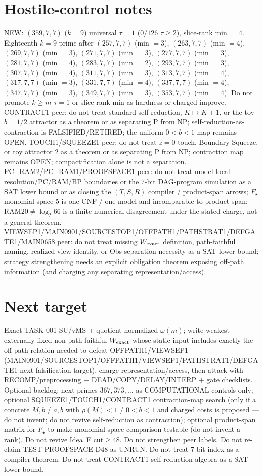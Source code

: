 \documentclass[11pt]{article}
\begin{document}
\section*{Hostile-control notes}
NEW: $(359,7,7)$ ($k{=}9$) universal $\tau{=}1$ ($0/126$ $\tau{\ge}2$), slice-rank min $=4$.
Eighteenth $k{=}9$ prime after $(257,7,7)$ (min $=3$), $(263,7,7)$ (min $=4$), $(269,7,7)$ (min $=3$), $(271,7,7)$ (min $=3$), $(277,7,7)$ (min $=3$), $(281,7,7)$ (min $=4$), $(283,7,7)$ (min $=2$), $(293,7,7)$ (min $=3$), $(307,7,7)$ (min $=4$), $(311,7,7)$ (min $=3$), $(313,7,7)$ (min $=4$), $(317,7,7)$ (min $=3$), $(331,7,7)$ (min $=4$), $(337,7,7)$ (min $=4$), $(347,7,7)$ (min $=3$), $(349,7,7)$ (min $=3$), $(353,7,7)$ (min $=4$).
Do not promote $k{\ge}m$ $\tau{=}1$ or slice-rank min as hardness or charged improve.
CONTRACT1 peer: do not treat standard self-reduction, $K\mapsto K+1$, or the toy $b{=}1/2$ attractor as a theorem or as separating P from NP;
self-reduction-as-contraction is FALSIFIED/RETIRED; the uniform $0{<}b{<}1$ map remains OPEN.
TOUCH1/SQUEEZE1 peer: do not treat $z{=}0$ touch, Boundary-Squeeze, or toy attractor $2$ as a theorem or as separating P from NP;
contraction map remains OPEN; compactification alone is not a separation.
PC\_RAM2/PC\_RAM1/PROOFSPACE1 peer: do not treat model-local resolution/PC/RAM/BP boundaries or the $7$-bit DAG-program simulation as a SAT lower bound
or as closing the $(T,S,R)$ compiler / product-span arrows; $F_\star$ monomial space $5$ is one CNF / one model and incomparable to product-span;
RAM$20\neq\log_2 66$ is a finite numerical disagreement under the stated charge, not a general theorem.
VIEWSEP1/MAIN0901/SOURCESTOP1/OFFPATH1/PATHSTRAT1/DEFGATE1/MAIN0658 peer: do not treat missing $W_{\rm exact}$ definition,
path-faithful naming, realized-view identity, or Obs-separation necessity as a SAT lower bound;
strategy strengthening needs an explicit obligation theorem exposing off-path information
(and charging any separating representation/access).

\section*{Next target}
Exact TASK-001 SU/vMS + quotient-normalized $\omega(m)$; write weakest externally fixed non-path-faithful
$W_{\rm exact}$ whose static input includes exactly the off-path relation needed to defeat OFFPATH1/VIEWSEP1
(MAIN0901/SOURCESTOP1/OFFPATH1/VIEWSEP1/PATHSTRAT1/DEFGATE1 next-falsification target), charge representation/access,
then attack with RECOMP/preprocessing + DEAD/COPY/DELAY/INTERP + gate checklists.
Optional backlog: next primes $367,373,\ldots$ as COMPUTATIONAL controls only;
optional SQUEEZE1/TOUCH1/CONTRACT1 contraction-map search (only if a concrete $M,b$ / $a,b$ with $\rho(M){<}1$ / $0{<}b{<}1$ and charged costs is proposed --- do not invent; do not revive self-reduction as contraction);
optional product-span matrix for $F_\star$ to make monomial-space comparison testable (do not invent a rank).
Do not revive Idea~F cut$\ge48$. Do not strengthen peer labels.
Do not re-claim TEST-PROOFSPACE-D48 as UNRUN.
Do not treat $7$-bit index as a compiler theorem.
Do not treat CONTRACT1 self-reduction algebra as a SAT lower bound.
\end{document}

